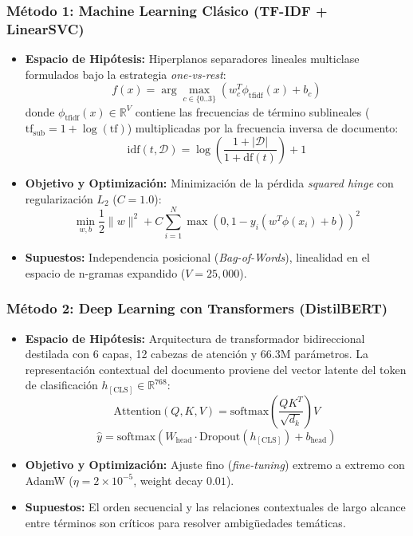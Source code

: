 \documentclass[conference]{IEEEtran}
\begin{document}
\subsubsection{Método 1: Machine Learning Clásico (TF-IDF + LinearSVC)}
\begin{itemize}
    \item \textbf{Espacio de Hipótesis:} Hiperplanos separadores lineales multiclase formulados bajo la estrategia \textit{one-vs-rest}:
    \begin{equation}
    f(x) = \arg\max_{c \in \{0..3\}} \left( w_c^T \phi_{\text{tfidf}}(x) + b_c \right)
    \end{equation}
    donde $\phi_{\text{tfidf}}(x) \in \mathbb{R}^V$ contiene las frecuencias de término sublineales ($\text{tf}_{\text{sub}} = 1 + \log(\text{tf})$) multiplicadas por la frecuencia inversa de documento:
    \begin{equation}
    \text{idf}(t, \mathcal{D}) = \log\left(\frac{1 + |\mathcal{D}|}{1 + \text{df}(t)}\right) + 1
    \end{equation}
    \item \textbf{Objetivo y Optimización:} Minimización de la pérdida \textit{squared hinge} con regularización $L_2$ ($C=1.0$):
    \begin{equation}
    \min_{w, b} \frac{1}{2} \|w\|^2 + C \sum_{i=1}^N \max(0, 1 - y_i (w^T \phi(x_i) + b))^2
    \end{equation}
    \item \textbf{Supuestos:} Independencia posicional (\textit{Bag-of-Words}), linealidad en el espacio de n-gramas expandido ($V = 25,000$).
\end{itemize}

\subsubsection{Método 2: Deep Learning con Transformers (DistilBERT)}
\begin{itemize}
    \item \textbf{Espacio de Hipótesis:} Arquitectura de transformador bidireccional destilada con 6 capas, 12 cabezas de atención y 66.3M parámetros. La representación contextual del documento proviene del vector latente del token de clasificación $h_{[\text{CLS}]} \in \mathbb{R}^{768}$:
    \begin{equation}
    \text{Attention}(Q, K, V) = \text{softmax}\left(\frac{QK^T}{\sqrt{d_k}}\right)V
    \end{equation}
    \begin{equation}
    \hat{y} = \text{softmax}\left( W_{\text{head}} \cdot \text{Dropout}(h_{[\text{CLS}]}) + b_{\text{head}} \right)
    \end{equation}
    \item \textbf{Objetivo y Optimización:} Ajuste fino (\textit{fine-tuning}) extremo a extremo con AdamW ($\eta = 2 \times 10^{-5}$, weight decay $0.01$).
    \item \textbf{Supuestos:} El orden secuencial y las relaciones contextuales de largo alcance entre términos son críticos para resolver ambigüedades temáticas.
\end{itemize}
\end{document}
